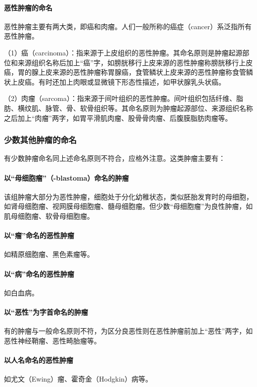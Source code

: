 \paragraph{恶性肿瘤的命名}
恶性肿瘤主要有两大类，即癌和肉瘤。人们一般所称的癌症（cancer）系泛指所有恶性肿瘤。

（1）癌（carcinoma）：指来源于上皮组织的恶性肿瘤。其命名原则是肿瘤起源部位和来源组织名称后加上“癌”字，如膀胱移行上皮来源的恶性肿瘤称膀胱移行上皮癌，胃的腺上皮来源的恶性肿瘤称胃腺癌，食管鳞状上皮来源的恶性肿瘤称食管鳞状上皮癌。有时还加上肉眼或显微镜下形态性描述，如甲状腺乳头状癌。

（2）肉瘤（sarcoma）：指来源于间叶组织的恶性肿瘤。间叶组织包括纤维、脂肪、横纹肌、脉管、骨、软骨组织等。其命名原则为肿瘤起源部位、来源组织名称之后加上“肉瘤”两字，如胃平滑肌肉瘤、股骨骨肉瘤、后腹膜脂肪肉瘤等。

\subsubsection{少数其他肿瘤的命名}

有少数肿瘤命名同上述命名原则不符合，应格外注意。这类肿瘤主要有：

\paragraph{以“母细胞瘤”（-blastoma）命名的肿瘤}
该组肿瘤大部分为恶性肿瘤，细胞处于分化幼稚状态，类似胚胎发育时的母细胞，如肾母细胞瘤、视网膜母细胞瘤、髓母细胞瘤。但少数“母细胞瘤”为良性肿瘤，如肌母细胞瘤、软骨母细胞瘤。

\paragraph{以“瘤”命名的恶性肿瘤}
如精原细胞瘤、黑色素瘤等。

\paragraph{以“病”命名的恶性肿瘤}
如白血病。

\paragraph{以“恶性”为字首命名的肿瘤}
有的肿瘤与一般命名原则不符，为区分良恶性则在恶性肿瘤前加上“恶性”两字，如恶性神经鞘瘤、恶性畸胎瘤等。

\paragraph{以人名命名的恶性肿瘤}
如尤文（Ewing）瘤、霍奇金（Hodgkin）病等。

